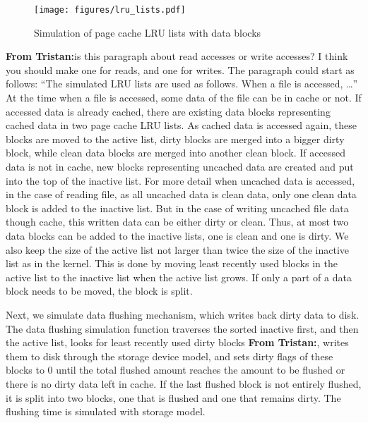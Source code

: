 \documentclass[conference]{IEEEtran}
\newcommand{\tristan}[1]{\color{orange}\textbf{From Tristan:}#1\color{black}}
\begin{document}
			\begin{figure}
   				\centering
   				\texttt{[image: figures/lru\_lists.pdf]}
   				\caption{Simulation of page cache LRU lists with data blocks}\label{fig:lrulist}
			\end{figure}	
			
			
			\tristan{is this paragraph about read accesses or write accesses? I
			think you should make one for reads, and one for writes. The
			paragraph could start as follows: ``The simulated LRU lists are used
			as follows. When a file is accessed, \ldots ''} At the time when a
			file is accessed, some data of the file can be in cache or not. If
			accessed data is already cached, there are existing data blocks
			representing cached data in two page cache LRU lists. 
			As cached data is accessed again, these blocks are moved to 
			the active list, dirty blocks are merged into a bigger dirty block, 
			while clean data blocks are merged into another clean block. 
			If accessed data is not in cache, new blocks representing uncached data 
			are created and put into the top of the inactive list. 
			For more detail when uncached data is accessed, in the case of 
			reading file, as all uncached data is clean data, only one clean data 
			block is added to the inactive list.
			But in the case of writing uncached file data though cache, 
			this written data can be either dirty or clean. 
			Thus, at most two data blocks can be added to the inactive lists, 
			one is clean and one is dirty. 
			We also keep the size of the active list not larger than twice the size of 
			the inactive list as in the kernel. This is done by moving least recently 
			used blocks in the active list to the inactive list when the active list 
			grows. If only a part of a data block needs to be moved, 
			the block is split.

			Next, we simulate data flushing mechanism, which writes back 
			dirty data to disk. 
			The data flushing simulation function traverses the sorted inactive first, 
			and then the active list, looks for least recently used dirty blocks \tristan{, writes them to disk through the storage device model,} and 
			sets dirty flags of these blocks to 0 until the total flushed amount 
			reaches the amount to be flushed or there is no dirty data left in cache. 
			If the last flushed block is not entirely flushed, it is split into 
			two blocks, one that is flushed and one that remains dirty.
			The flushing time is simulated with storage model.
			
\end{document}
